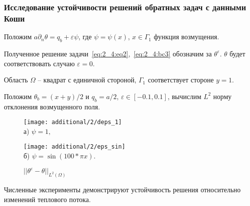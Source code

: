 \begin{frame}
    \frametitle{Исследование устойчивости решений обратных задач с данными Коши}
    Положим $a\partial_n \theta = q_b +\varepsilon \psi$, где $\psi = \psi(x)$, $x \in \Gamma_1$ функция возмущения.

    Полученное решение задачи~\eqref{eq:2_4:eq2},~\eqref{eq:2_4:bc3} обозначим за $\theta^{\varepsilon}$.
    $\theta$ будет соответствовать случаю $\varepsilon = 0$.

    Область $\Omega$ -- квадрат с единичной стороной, $\Gamma_1$ соответствует стороне $y = 1$.

    Положим $\theta_b = (x + y) / 2$ и $q_b = a / 2$, $\varepsilon \in [-0.1, 0.1]$,
    вычислим $L^2$ норму отклонения возмущенного поля.
    \begin{figure}[h!t]
        \begin{minipage}[b][][b]{0.4\linewidth}
            \centering
            \texttt{[image: additional/2/deps\_1]}\\ а) $\psi = 1,$
        \end{minipage}
        \hfill
        \begin{minipage}[b][][b]{0.4\linewidth}
            \centering
            \texttt{[image: additional/2/eps\_sin]} \\ б) $\psi = \sin (100 * \pi x)$.
        \end{minipage}
        \caption{$||\theta^\varepsilon - \theta||_{L^2(\Omega)}$}
        \label{fig:4_4:vareps}
    \end{figure}
    Численные эксперименты демонстрируют
    устойчивость решения относительно изменений теплового потока.
\end{frame}
